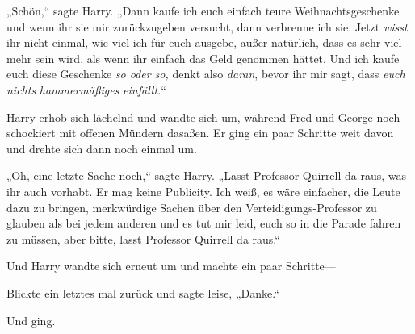 „Schön,“ sagte Harry. „Dann kaufe ich euch einfach teure Weihnachtsgeschenke und wenn ihr sie mir zurückzugeben versucht, dann verbrenne ich sie. Jetzt \emph{wisst} ihr nicht einmal, wie viel ich für euch ausgebe, außer natürlich, dass es sehr viel mehr sein wird, als wenn ihr einfach das Geld genommen hättet. Und ich kaufe euch diese Geschenke \emph{so oder so,} denkt also \emph{daran}, bevor ihr mir sagt, dass \emph{euch nichts} \emph{hammermäßiges} \emph{einfällt.}“%

Harry erhob sich lächelnd und wandte sich um, während Fred und George noch schockiert mit offenen Mündern dasaßen. Er ging ein paar Schritte weit davon und drehte sich dann noch einmal um.

„Oh, eine letzte Sache noch,“ sagte Harry. „Lasst Professor Quirrell da raus, was ihr auch vorhabt. Er mag keine Publicity. Ich weiß, es wäre einfacher, die Leute dazu zu bringen, merkwürdige Sachen über den Verteidigungs-Professor zu glauben als bei jedem anderen und es tut mir leid, euch so in die Parade fahren zu müssen, aber bitte, lasst Professor Quirrell da raus.“

Und Harry wandte sich erneut um und machte ein paar Schritte—

Blickte ein letztes mal zurück und sagte leise, „Danke.“

Und ging.

